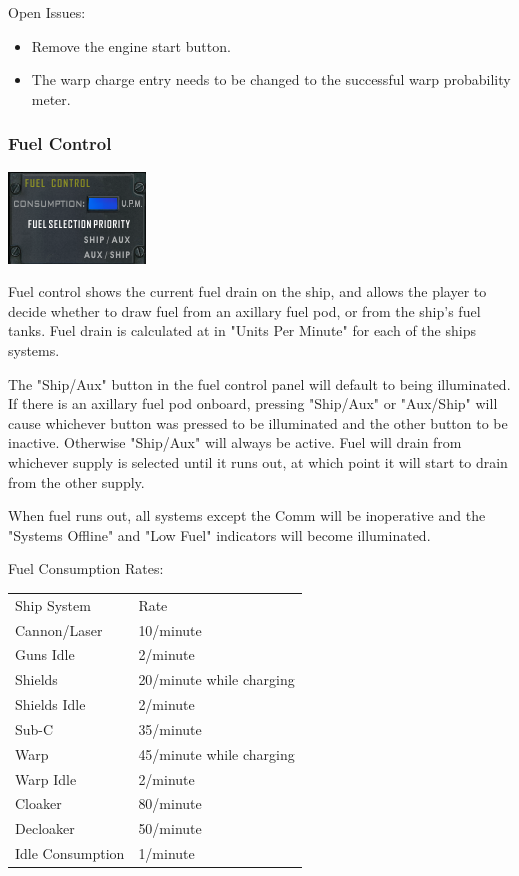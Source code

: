 Open Issues:
\begin{itemize}
\item Remove the engine start button.
\item The warp charge entry needs to be changed to the successful warp
probability meter.
\end{itemize}

\subsubsection{Fuel Control}
\includegraphics[scale=0.70]{images/fuelcontrol.png}

Fuel control shows the current fuel drain on the ship, and allows the player
to decide whether to draw fuel from an axillary fuel pod, or from the
ship's fuel tanks.  Fuel drain is calculated at in "Units Per Minute" for
each of the ships systems.

The "Ship\slash Aux" button in the fuel control panel will default to
being illuminated.  If there is an axillary fuel pod onboard, pressing
"Ship\slash Aux" or "Aux\slash Ship" will cause whichever button was
pressed to be illuminated and the other button to be inactive.  Otherwise
"Ship\slash Aux" will always be active.  Fuel will drain from whichever
supply is selected until it runs out, at which point it will start to drain
from the other supply.  

When fuel runs out, all systems except the Comm will be inoperative and
the "Systems Offline" and "Low Fuel" indicators will become illuminated.

Fuel Consumption Rates:

\begin{tabular}{ | l | l | }
\hline
Ship System & Rate \\
Cannon\slash Laser & 10\slash minute \\
Guns Idle & 2\slash minute \\
Shields & 20\slash minute while charging \\
Shields Idle & 2\slash minute \\
Sub-C & 35\slash minute \\
Warp & 45\slash minute while charging \\
Warp Idle & 2\slash minute \\
Cloaker & 80\slash minute \\
Decloaker & 50\slash minute \\
Idle Consumption & 1\slash minute \\
\hline
\end{tabular}


